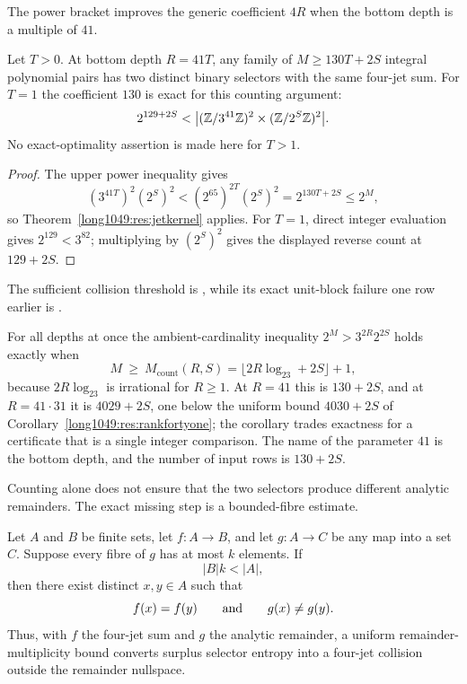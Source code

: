 \documentclass[11pt]{article}
\begin{document}
The power bracket improves the generic coefficient $4R$ when the bottom depth
is a multiple of $41$.

\begin{corollary}\label{long1049:res:rankfortyone}
Let $T>0$.  At bottom depth $R=41T$, any family of
$M\ge130T+2S$ integral polynomial pairs has two distinct binary selectors
with the same four-jet sum.  For $T=1$ the coefficient $130$ is exact for
this counting argument:
\[
 2^{129+2S}<\bigl| (\mathbb{Z}/3^{41}\mathbb{Z})^2\times
                       (\mathbb{Z}/2^S\mathbb{Z})^2\bigr|.
\]
No exact-optimality assertion is made here for $T>1$.
\end{corollary}

\begin{proof}
The upper power inequality gives
\[
 (3^{41T})^2(2^S)^2
 <(2^{65})^{2T}(2^S)^2=2^{130T+2S}\le2^M,
\]
so Theorem~\ref{long1049:res:jetkernel} applies.  For $T=1$, direct integer
evaluation gives $2^{129}<3^{82}$; multiplying by $(2^S)^2$ gives the
displayed reverse count at $129+2S$.
\end{proof}

\noindent The sufficient collision threshold is
,
while its exact unit-block failure one row earlier is
.

For all depths at once the ambient-cardinality inequality $2^{M}>3^{2R}2^{2S}$
holds exactly when
\[
 M\ \ge\ M_{\mathrm{count}}(R,S)=\bigl\lfloor2R\log_23+2S\bigr\rfloor+1,
\]
because $2R\log_23$ is irrational for $R\ge1$.  At $R=41$ this is $130+2S$, and
at $R=41\cdot31$ it is $4029+2S$, one below the uniform bound $4030+2S$ of
Corollary~\ref{long1049:res:rankfortyone}; the corollary trades exactness for a
certificate that is a single integer comparison.  The name of the parameter $41$
is the bottom depth, and the number of input rows is $130+2S$.

Counting alone does not ensure that the two selectors produce different
analytic remainders.  The exact missing step is a bounded-fibre estimate.

\begin{theorem}\label{long1049:res:boundedfibre}
Let $A$ and $B$ be finite sets, let $f:A\to B$, and let $g:A\to C$ be any
map into a set $C$.  Suppose every fibre of $g$ has at most $k$ elements.  If
\[
 |B|k<|A|,
\]
then there exist distinct $x,y\in A$ such that
\[
 f(x)=f(y)\qquad\hbox{and}\qquad g(x)\ne g(y).
\]
Thus, with $f$ the four-jet sum and $g$ the analytic remainder, a uniform
remainder-multiplicity bound converts surplus selector entropy into a
four-jet collision outside the remainder nullspace.
\end{theorem}
\end{document}

